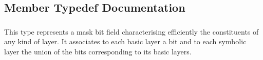 \subsection{Member Typedef Documentation}
\hypertarget{classHurricane_1_1Layer_af5277c670637bd5d910237e7afe01a91}{
\subsubsection[{Mask}]{}}\label{classHurricane_1_1Layer_af5277c670637bd5d910237e7afe01a91}
This type represents a mask bit field characterising efficiently the constituents of any kind of layer. It associates to each basic layer a bit and to each symbolic layer the union of the bits corresponding to its basic layers. 

